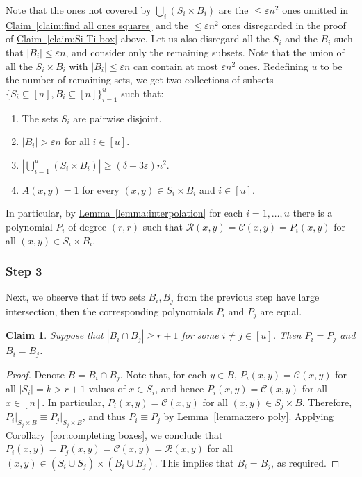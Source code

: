 \documentclass[11pt]{article}
\numberwithin{equation}{section}
\newtheorem{claim}[theorem]{Claim}
\theoremstyle{definition}
\theoremstyle{plain}
\newcommand{\expref}[2]{\hyperref[#2]{#1~\ref{#2}}}
\theoremstyle{plain}
\newcommand{\colored}{}
\newcommand{\blocklength}{\colored{n}} %
\newcommand{\degree}{\colored{r}}
\newcommand{\rowpoly}{\colored{\mathcal R}}
\newcommand{\colpoly}{\colored{\mathcal C}}
\newcommand{\prox}{\colored{\delta}}
\newcommand{\numrect}{\colored{u}}
\newcommand{\eps}{\varepsilon}
\newcommand\abs[1]{\colored{\left|#1\right|}}
\begin{document}
    \medskip\noindent
    Note that the ones not covered by $\bigcup_{i} (S_i \times B_i)$ are the
    $\leq \eps \blocklength^2$ ones omitted in \expref{Claim}{claim:find all ones squares}
    and the $\leq \eps \blocklength^2$ ones disregarded in the proof of \expref{Claim}{claim:Si-Ti box} above.
    Let us also disregard all
%
the $S_i$ and the $B_i$     %
such that $\abs{B_i} \leq \eps \blocklength$, and consider only the remaining subsets.
%
%
%
%
Note that the union of all
the   %
$S_i \times B_i$             %
with $\abs{B_i} \leq \eps \blocklength$ can %
contain     %
at most $\eps \blocklength^2$ ones.
    Redefining $\numrect$ to be the number of remaining sets, we get two collections of subsets $\{S_i \subseteq [\blocklength], B_i  \subseteq [\blocklength]\}_{i=1}^{\numrect}$ such that:
    \begin{enumerate}
%
%
        \item The sets $S_i$ are pairwise disjoint.                         %
        \item $\abs{B_i} > \eps n$ for all $i \in [\numrect]$.
        \item $\abs{ \bigcup_{i=1}^{\numrect} (S_i \times B_i)} \geq (\prox - 3\eps)\blocklength^2$.
        \item $A(x,y) = 1$ for every $(x,y) \in {S_i \times B_i}$ and $i \in [\numrect]$.
    \end{enumerate}
    In particular, by \expref{Lemma}{lemma:interpolation} for each $i=1, \dots, \numrect$
    there is a polynomial $P_i$ of degree $(\degree,\degree)$ such that
    $\rowpoly(x,y) = \colpoly(x,y) = P_i(x,y)$ for all $(x,y) \in S_i \times B_i$.

   \subsubsection{Step 3}
    Next, we observe that if two sets $B_i,B_j$ from the previous step have large intersection,
    then the corresponding polynomials $P_i$ and $P_j$ are equal.

    \begin{claim}\label{claim:Pi=Pj}
        Suppose that $\abs{B_i \cap B_j} \geq \degree+1$ for some $i \neq j \in [\numrect]$.
        Then $P_i = P_j$ and $B_i = B_j$.
    \end{claim}
    \begin{proof}
        Denote $B = B_i \cap B_j$.
        Note that, for each $y \in B$,
        $P_i(x,y) = \colpoly(x,y)$ for all $|S_i| = k > \degree+1$ values of $x \in S_i$,
        and hence $P_i(x,y) = \colpoly(x,y)$ for all $x \in [\blocklength]$.
        In particular, $P_i(x,y) = \colpoly(x,y)$ for all $(x,y) \in S_j \times B$.
        Therefore, ${P_i} \vert_{S_j \times B}  \equiv {P_j} \vert_{S_j \times B}$,
        and thus $P_i \equiv P_j$ by \expref{Lemma}{lemma:zero poly}.
        Applying \expref{Corollary}{cor:completing boxes}, we conclude that $P_i(x,y) = P_j(x,y) = \colpoly(x,y) = \rowpoly(x,y)$
        for all $(x,y) \in (S_i \cup S_j) \times (B_i \cup B_j)$.
        This implies that $B_i = B_j$, as required.
    \end{proof}
\end{document}
